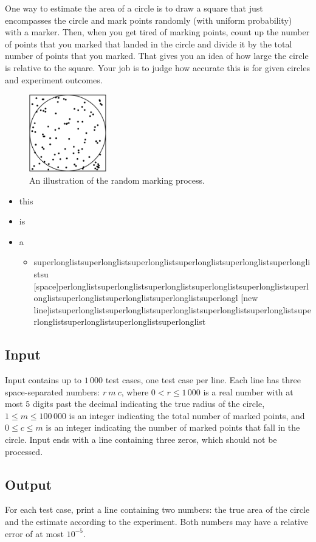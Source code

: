 
One way to estimate the area of a circle is to draw a square that just
encompasses the circle and mark points randomly (with uniform
probability) with a marker. Then, when you get tired of marking points,
count up the number of points that you marked that landed in the circle
and divide it by the total number of points that you marked. That gives
you an idea of how large the circle is relative to the square. Your job
is to judge how accurate this is for given circles and experiment
outcomes.

\begin{figure}
\centering
\includegraphics[width=0.3\textwidth,height=0.1\textheight]{circle.pdf}
\caption{An illustration of the random marking process.}
\end{figure}

\newcommand{\tightlist}{}

\begin{itemize}
\item
  this
\item
  is
\item
  a

  \begin{itemize}
  \tightlist
  \item
    superlonglistsuperlonglistsuperlonglistsuperlonglistsuperlonglistsuperlonglistsu
    {[}space{]}perlonglistsuperlonglistsuperlonglistsuperlonglistsuperlonglistsuperlonglistsuperlonglistsuperlonglistsuperlonglistsuperlongl
    {[}new
    line{]}istsuperlonglistsuperlonglistsuperlonglistsuperlonglistsuperlonglistsuperlonglistsuperlonglistsuperlonglistsuperlonglist
  \end{itemize}
\end{itemize}

\hypertarget{input}{%
\subsection{Input}\label{input}}

Input contains up to \(1\,000\) test cases, one test case per line. Each
line has three space-separated numbers: \(r\ m\ c\), where
\(0 < r \le 1\,000\) is a real number with at most \(5\) digits past the
decimal indicating the true radius of the circle,
\(1 \le m \le 100\,000\) is an integer indicating the total number of
marked points, and \(0 \le c \le m\) is an integer indicating the number
of marked points that fall in the circle. Input ends with a line
containing three zeros, which should not be processed.

\hypertarget{output}{%
\subsection{Output}\label{output}}

For each test case, print a line containing two numbers: the true area
of the circle and the estimate according to the experiment. Both numbers
may have a relative error of at most \(10^{-5}\).
